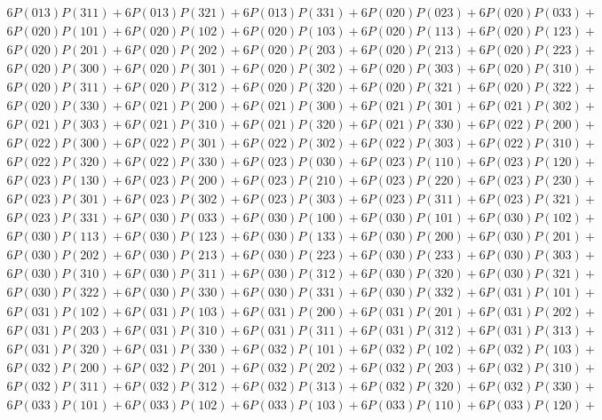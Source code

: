 \begin{align*}
	6P(013)P(311) + 6P(013)P(321) + 6P(013)P(331) + 6P(020)P(023) + 6P(020)P(033)+ \\
	6P(020)P(101) + 6P(020)P(102) + 6P(020)P(103) + 6P(020)P(113) + 6P(020)P(123)+ \\
	6P(020)P(201) + 6P(020)P(202) + 6P(020)P(203) + 6P(020)P(213) + 6P(020)P(223)+ \\
	6P(020)P(300) + 6P(020)P(301) + 6P(020)P(302) + 6P(020)P(303) + 6P(020)P(310)+ \\
	6P(020)P(311) + 6P(020)P(312) + 6P(020)P(320) + 6P(020)P(321) + 6P(020)P(322)+ \\
	6P(020)P(330) + 6P(021)P(200) + 6P(021)P(300) + 6P(021)P(301) + 6P(021)P(302)+ \\
	6P(021)P(303) + 6P(021)P(310) + 6P(021)P(320) + 6P(021)P(330) + 6P(022)P(200)+ \\
	6P(022)P(300) + 6P(022)P(301) + 6P(022)P(302) + 6P(022)P(303) + 6P(022)P(310)+ \\
	6P(022)P(320) + 6P(022)P(330) + 6P(023)P(030) + 6P(023)P(110) + 6P(023)P(120)+ \\
	6P(023)P(130) + 6P(023)P(200) + 6P(023)P(210) + 6P(023)P(220) + 6P(023)P(230)+ \\
	6P(023)P(301) + 6P(023)P(302) + 6P(023)P(303) + 6P(023)P(311) + 6P(023)P(321)+ \\
	6P(023)P(331) + 6P(030)P(033) + 6P(030)P(100) + 6P(030)P(101) + 6P(030)P(102)+ \\
	6P(030)P(113) + 6P(030)P(123) + 6P(030)P(133) + 6P(030)P(200) + 6P(030)P(201)+ \\
	6P(030)P(202) + 6P(030)P(213) + 6P(030)P(223) + 6P(030)P(233) + 6P(030)P(303)+ \\
	6P(030)P(310) + 6P(030)P(311) + 6P(030)P(312) + 6P(030)P(320) + 6P(030)P(321)+ \\
	6P(030)P(322) + 6P(030)P(330) + 6P(030)P(331) + 6P(030)P(332) + 6P(031)P(101)+ \\
	6P(031)P(102) + 6P(031)P(103) + 6P(031)P(200) + 6P(031)P(201) + 6P(031)P(202)+ \\
	6P(031)P(203) + 6P(031)P(310) + 6P(031)P(311) + 6P(031)P(312) + 6P(031)P(313)+ \\
	6P(031)P(320) + 6P(031)P(330) + 6P(032)P(101) + 6P(032)P(102) + 6P(032)P(103)+ \\
	6P(032)P(200) + 6P(032)P(201) + 6P(032)P(202) + 6P(032)P(203) + 6P(032)P(310)+ \\
	6P(032)P(311) + 6P(032)P(312) + 6P(032)P(313) + 6P(032)P(320) + 6P(032)P(330)+ \\
	6P(033)P(101) + 6P(033)P(102) + 6P(033)P(103) + 6P(033)P(110) + 6P(033)P(120)+ \\

\end{align*}
